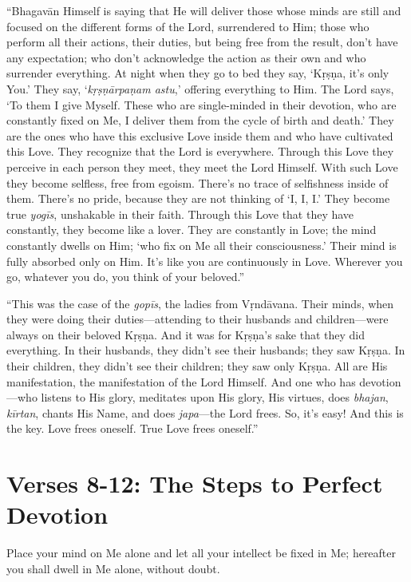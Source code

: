 \enquote{Bhagavān Himself is saying that He will deliver those whose minds are still and focused on the different forms of the Lord, surrendered to Him; those who perform all their actions, their duties, but being free from the result, don’t have any expectation; who don’t acknowledge the action as their own and who surrender everything. At night when they go to bed they say, \enquote{Kṛṣṇa, it’s only You.} They say, \enquote{\textit{kṛṣṇārpaṇam astu},} offering everything to Him. The Lord says, \enquote{To them I give Myself. These who are single-minded in their devotion, who are constantly fixed on Me, I deliver them from the cycle of birth and death.} They are the ones who have this exclusive Love inside them and who have cultivated this Love. They recognize that the Lord is everywhere. Through this Love they perceive in each person they meet, they meet the Lord Himself. With such Love they become selfless, free from egoism. There’s no trace of selfishness inside of them. There’s no pride, because they are not thinking of \enquote{I, I, I.} They become true \textit{yogīs}, unshakable in their faith. Through this Love that they have constantly, they become like a lover. They are constantly in Love; the mind constantly dwells on Him; \enquote{who fix on Me all their consciousness.} Their mind is fully absorbed only on Him. It’s like you are continuously in Love. Wherever you go, whatever you do, you think of your beloved.}

\enquote{This was the case of the \textit{gopīs}, the ladies from Vṛndāvana. Their minds, when they were doing their duties---attending to their husbands and children---were always on their beloved Kṛṣṇa. And it was for Kṛṣṇa's sake that they did everything. In their husbands, they didn’t see their husbands; they saw Kṛṣṇa. In their children, they didn’t see their children; they saw only Kṛṣṇa. All are His manifestation, the manifestation of the Lord Himself. And one who has devotion---who listens to His glory, meditates upon His glory, His virtues, does \textit{bhajan}, \textit{kīrtan}, chants His Name, and does \textit{japa}---the Lord frees. So, it’s easy! And this is the key. Love frees oneself. True Love frees oneself.}

\section{Verses 8-12: The Steps to Perfect Devotion}\label{sec-verses-8-12-the-steps-to-perfect-devotion}

{Place your mind on Me alone and let all your intellect be fixed in Me; hereafter you shall dwell in Me alone, without doubt.}

